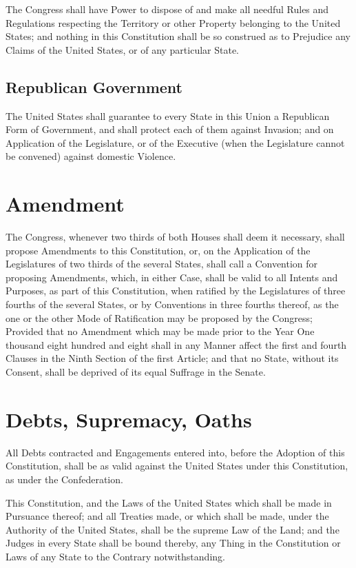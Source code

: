 \documentclass{constitution}
\begin{document}
The Congress shall have Power to dispose of and make all needful Rules and Regulations respecting the Territory or other Property belonging to the United States;
and nothing in this Constitution shall be so construed as to Prejudice any Claims of the United States, or of any particular State.

\section{Republican Government}
The United States shall guarantee to every State in this Union a Republican Form of Government,
and shall protect each of them against Invasion;
and on Application of the Legislature,
or of the Executive (when the Legislature cannot be convened)
against domestic Violence.

\chapter{Amendment}
The Congress, whenever two thirds of both Houses shall deem it necessary,
shall propose Amendments to this Constitution,
or, on the Application of the Legislatures of two thirds of the several States,
shall call a Convention for proposing Amendments,
which, in either Case, shall be valid to all Intents and Purposes, as part of this Constitution,
when ratified by the Legislatures of three fourths of the several States,
or by Conventions in three fourths thereof,
as the one or the other Mode of Ratification may be proposed by the Congress;
Provided that no Amendment which may be made prior to the Year One thousand eight hundred and eight shall in any Manner affect the first and fourth Clauses in the Ninth Section of the first Article;
and that no State, without its Consent, shall be deprived of its equal Suffrage in the Senate.

\chapter{Debts, Supremacy, Oaths}
All Debts contracted and Engagements entered into, before the Adoption of this Constitution,
shall be as valid against the United States under this Constitution, as under the Confederation.

This Constitution, and the Laws of the United States which shall be made in Pursuance thereof;
and all Treaties made, or which shall be made, under the Authority of the United States,
shall be the supreme Law of the Land;
and the Judges in every State shall be bound thereby,
any Thing in the Constitution or Laws of any State to the Contrary notwithstanding.
\end{document}
